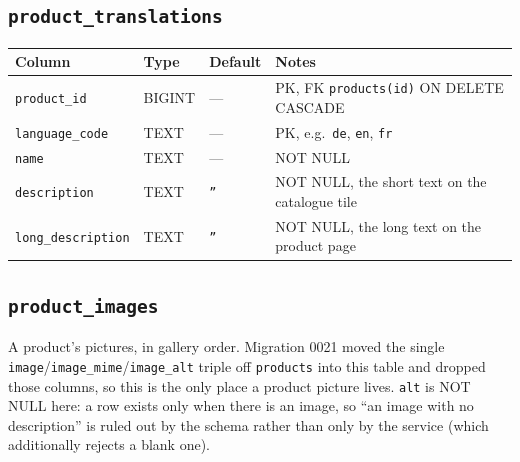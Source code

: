 \documentclass[12pt,a4paper,twoside]{report}
\newcommand{\code}[1]{\texttt{#1}}
\begin{document}
\subsection*{\texttt{product\_translations}}

\begin{table}[H]
  \centering\small
  \begin{tabular}{@{}llll@{}}
    \toprule
    \textbf{Column} & \textbf{Type} & \textbf{Default} & \textbf{Notes} \\
    \midrule
    \code{product\_id}    & BIGINT & --- & PK, FK \textrightarrow{} \code{products(id)} ON DELETE CASCADE \\
    \code{language\_code} & TEXT   & --- & PK, e.g.\ \code{de}, \code{en}, \code{fr} \\
    \code{name}           & TEXT   & --- & NOT NULL \\
    \code{description}    & TEXT   & \code{''} & NOT NULL, the short text on the catalogue tile \\
    \code{long\_description} & TEXT & \code{''} & NOT NULL, the long text on the product page \\
    \bottomrule
  \end{tabular}
\end{table}

\subsection*{\texttt{product\_images}}

A product's pictures, in gallery order. Migration 0021 moved the single
\code{image}/\code{image\_mime}/\code{image\_alt} triple off \code{products} into
this table and dropped those columns, so this is the only place a product picture
lives. \code{alt} is NOT NULL here: a row exists only when there is an image, so
``an image with no description'' is ruled out by the schema rather than only by the
service (which additionally rejects a blank one).
\end{document}
